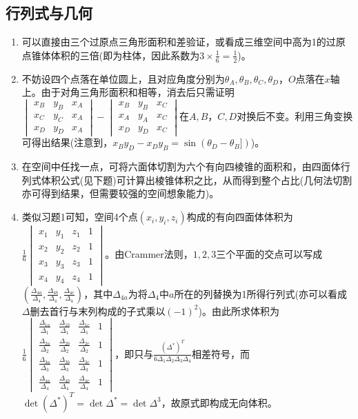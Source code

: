 \documentclass[a4paper,UTF8,fontset=windows]{ctexart}
\begin{document}
\subsection{行列式与几何}
\begin{enumerate}
\item
可以直接由三个过原点三角形面积和差验证，或看成三维空间中高为1的过原点锥体体积的三倍(即为柱体，因此系数为$3\times\frac{1}{6}=\frac{1}{2}$)。

\item
不妨设四个点落在单位圆上，且对应角度分别为$\theta_A,\theta_B,\theta_C,\theta_D$，$O$点落在$x$轴上。由于对角三角形面积和相等，消去后只需证明$\begin{vmatrix}x_B&y_B&x_A\\x_C&y_C&x_A\\x_D&y_D&x_A\end{vmatrix}-\begin{vmatrix}x_B&y_B&x_C\\x_A&y_A&x_C\\x_D&y_D&x_C\end{vmatrix}$在$A,B$，$C,D$对换后不变。利用三角变换可得出结果(注意到，$x_By_D-x_Dy_B=\sin(\theta_D-\theta_B])$)。

\item
在空间中任找一点，可将六面体切割为六个有向四棱锥的面积和，由四面体行列式体积公式(见下题)可计算出棱锥体积之比，从而得到整个占比(几何法切割亦可得到结果，但需要较强的空间想象能力)。

\item
类似习题1可知，空间4个点$\left(x_i,y_i,z_i\right)$构成的有向四面体体积为$\frac{1}{6}\begin{vmatrix}x_1&y_1&z_1&1\\x_2&y_2&z_2&1\\x_3&y_3&z_3&1\\x_4&y_4&z_4&1\end{vmatrix}$。由Crammer法则，$1,2,3$三个平面的交点可以写成$\left(\frac{\Delta_{4a}}{\Delta_4},\frac{\Delta_{4b}}{\Delta_4},\frac{\Delta_{4c}}{\Delta_4}\right)$，其中$\Delta_{4a}$为将$\Delta_4$中$a$所在的列替换为1所得行列式(亦可以看成$\Delta$删去首行与末列构成的子式乘以$(-1)^2$)。由此所求体积为$\frac{1}{6}\begin{vmatrix}\frac{\Delta_{1a}}{\Delta_1}&\frac{\Delta_{1b}}{\Delta_1}&\frac{\Delta_{1c}}{\Delta_1}&1\\[2ex]\frac{\Delta_{2a}}{\Delta_2}&\frac{\Delta_{2b}}{\Delta_2}&\frac{\Delta_{2c}}{\Delta_2}&1\\[2ex]\frac{\Delta_{3a}}{\Delta_3}&\frac{\Delta_{3b}}{\Delta_3}&\frac{\Delta_{3c}}{\Delta_3}&1\\[2ex]\frac{\Delta_{4a}}{\Delta_4}&\frac{\Delta_{4b}}{\Delta_4}&\frac{\Delta_{4c}}{\Delta_4}&1\end{vmatrix}$，即只与$\frac{(\Delta^*)^T}{6\Delta_1\Delta_2\Delta_3\Delta_4}$相差符号，而$\det(\Delta^*)^T=\det\Delta^*=\det\Delta^3$，故原式即构成无向体积。


\end{enumerate}
\end{document}
